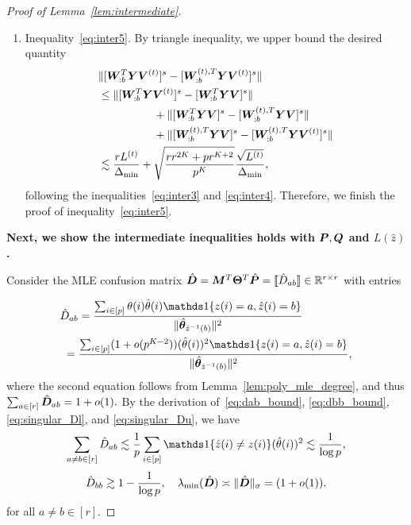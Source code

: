 \documentclass[journal]{IEEEtran}
\theoremstyle{definition}
\theoremstyle{definition}
\begin{document}
\begin{proof}[Proof of Lemma~\ref{lem:intermediate}]
\begin{enumerate}[wide]
    Therefore, combining the inequalities~\eqref{eq:j1}, \eqref{eq:j2}, and \eqref{eq:j3}, we finish the proof of inequality~\eqref{eq:inter4}. 
    
    

    \item Inequality~\eqref{eq:inter5}. By triangle inequality, we upper bound the desired quantity 
    \begin{align}
        &\lVert [ \bm{W}_{:b}^T \bm Y \bm{V}^{(t)} ]^s   -  [ \bm{W}_{:b}^{(t), T} \bm Y \bm{V}^{(t)} ]^s \rVert \\
        &\leq \lVert[ \bm{W}_{:b}^T \bm Y \bm{V}^{(t)} ]^s - [ \bm{W}_{:b}^T \bm Y \bm{V} ]^s \rVert \\ & \quad \quad \quad\quad\quad + \lVert[\bm{W}_{:b}^T \bm Y \bm{V} ]^s  - [ \bm{W}_{:b}^{(t),T} \bm Y \bm{V} ]^s \rVert \\
        & \quad \quad \quad\quad\quad+ \lVert[\bm{W}_{:b}^{(t),T} \bm Y \bm{V} ]^s  -  [\bm{W}_{:b}^{(t), T} \bm Y \bm{V}^{(t)} ]^s \rVert\\
        &\lesssim \frac{r L^{(t)}}{\Delta_{\min}} + \sqrt{ \frac{rr^{2K} + p r^{K+2}}{p^{K}}}  \frac{\sqrt{L^{(t)}}}{\Delta_{\min}},
    \end{align}
    \normalsize
    following the inequalities~\eqref{eq:inter3} and \eqref{eq:inter4}. Therefore, we finish the proof of inequality~\eqref{eq:inter5}.
        \end{enumerate}
  {
    
  \textbf{Next, we show the intermediate inequalities holds with $\bm{P}, \bm{Q}$ and $L(\hat z)$.}
        
        Consider the MLE confusion matrix $\hat {\bm{D}} = \bm M^T \boldsymbol{\Theta}^T \hat {\bm{P}} = \llbracket \hat D_{ab} \rrbracket \in \mathbb{R}^{r \times r}$ with entries
        
    \vspace{-0.5cm}
        \small
\begin{align}
    &\hat D_{ab}
    = \frac{ \sum_{i \in [p]} \theta(i) \hat \theta(i) \ind\{ z(i) = a, \hat z(i) = b  \} }{\onormSize{}{\hat \mtheta_{\hat z^{-1}(b)}}^2}\\
    &\ = \frac{ \sum_{i \in [p]} (1 + o(p^{K-2}))(\hat \theta(i))^2 \ind\{ z(i) = a, \hat z(i) = b  \} }{\onormSize{}{\hat \mtheta_{\hat z^{-1}(b)}}^2}, \label{eq:mle_confusion}
\end{align}
\normalsize
where the second equation follows from Lemma~\ref{lem:poly_mle_degree}, and thus $\sum_{a \in [r]}\hat {\bm{D}}_{ab} = 1 + o(1).$ By the derivation of~\eqref{eq:dab_bound}, \eqref{eq:dbb_bound}, \eqref{eq:singular_Dl}, and \eqref{eq:singular_Du}, we have 
\begin{equation}
     \sum_{a \neq b \in [r]} \hat D_{ab} \lesssim \frac{1}{p} \sum_{i \in [p]} \ind\{ \hat z(i) \neq z(i) \} (\hat \theta(i))^2 \lesssim \frac{1}{\log p},
\end{equation}
\begin{equation}
     \hat D_{bb} \gtrsim 1- \frac{1}{\log p}, \quad \lambda_{\min}(\hat {\bm{D}}) \asymp \lVert\hat {\bm{D}}\rVert_{\sigma} = (1 + o(1)).
\end{equation}
for all $a \neq b \in [r]$.

}
\end{proof}
\end{document}
